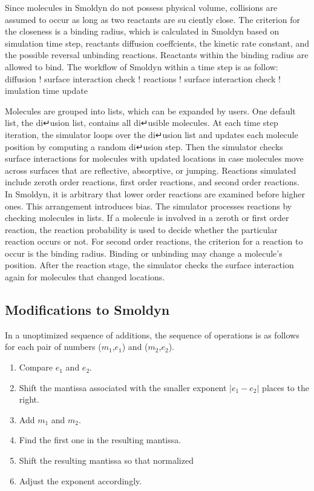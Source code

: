 Since molecules in Smoldyn do not possess physical volume, collisions are assumed to occur as long as two reactants are su ciently close. The criterion for the closeness is a binding radius, which is calculated in Smoldyn based on simulation time step, reactants diffusion coeffcients, the kinetic rate constant, and the possible reversal unbinding reactions. Reactants within the binding radius are allowed to bind.
The workflow of Smoldyn within a time step is as follow:
diffusion ! surface interaction check ! reactions ! surface interaction check ! imulation time update

Molecules are grouped into lists, which can be expanded by users. One default list, the di↵usion list, contains all di↵usible molecules. At each time step iteration, the simulator loops over the di↵usion list and updates each molecule position by computing a random di↵usion step. Then the simulator checks surface interactions for molecules with updated locations in case molecules move across surfaces that are reflective, absorptive, or jumping. Reactions simulated include zeroth order reactions, first order reactions, and second order reactions. In Smoldyn, it is arbitrary that lower order reactions are examined before higher ones. This arrangement introduces bias. The simulator processes reactions by checking molecules in lists. If a molecule is involved in a zeroth or first order reaction, the reaction probability is used to decide whether the particular reaction occurs or not. For second order reactions, the criterion for a reaction to occur is the binding radius. Binding or unbinding may change a molecule’s position. After the reaction stage, the simulator checks the surface interaction again for molecules that changed locations.



\subsection{Modifications to Smoldyn}

In a unoptimized sequence of additions, the sequence of operations is as
follows for each pair of numbers ($m_1$,$e_1$) and ($m_2$,$e_2$).
\begin{enumerate}
  \item Compare $e_1$ and $e_2$.
  \item Shift the mantissa associated with the smaller exponent $|e_1-e_2|$
        places to the right.
  \item Add $m_1$ and $m_2$.
  \item Find the first one in the resulting mantissa.
  \item Shift the resulting mantissa so that normalized
  \item Adjust the exponent accordingly.
\end{enumerate}

